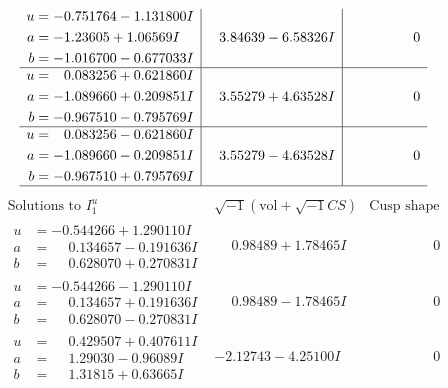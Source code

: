 \documentclass[1p]{elsarticle_modified}
\theoremstyle{definition}
\newcommand{\I}{\sqrt{-1}}
\begin{document}
$$\begin{array}{c|c|c}
\begin{aligned}
u &= -0.751764 - 1.131800 I \\
a &= -1.23605 + 1.06569 I \\
b &= -1.016700 - 0.677033 I\end{aligned}
 & \phantom{-}3.84639 - 6.58326 I & \phantom{-0.000000 } 0 \\ \hline\begin{aligned}
u &= \phantom{-}0.083256 + 0.621860 I \\
a &= -1.089660 + 0.209851 I \\
b &= -0.967510 - 0.795769 I\end{aligned}
 & \phantom{-}3.55279 + 4.63528 I & \phantom{-0.000000 } 0 \\ \hline\begin{aligned}
u &= \phantom{-}0.083256 - 0.621860 I \\
a &= -1.089660 - 0.209851 I \\
b &= -0.967510 + 0.795769 I\end{aligned}
 & \phantom{-}3.55279 - 4.63528 I & \phantom{-0.000000 } 0\\
 \hline 
 \end{array}$$\newpage$$\begin{array}{c|c|c}  
\text{Solutions to }I^u_{1}& \I (\text{vol} + \sqrt{-1}CS) & \text{Cusp shape}\\
 \hline 
\begin{aligned}
u &= -0.544266 + 1.290110 I \\
a &= \phantom{-}0.134657 - 0.191636 I \\
b &= \phantom{-}0.628070 + 0.270831 I\end{aligned}
 & \phantom{-}0.98489 + 1.78465 I & \phantom{-0.000000 } 0 \\ \hline\begin{aligned}
u &= -0.544266 - 1.290110 I \\
a &= \phantom{-}0.134657 + 0.191636 I \\
b &= \phantom{-}0.628070 - 0.270831 I\end{aligned}
 & \phantom{-}0.98489 - 1.78465 I & \phantom{-0.000000 } 0 \\ \hline\begin{aligned}
u &= \phantom{-}0.429507 + 0.407611 I \\
a &= \phantom{-}1.29030 - 0.96089 I \\
b &= \phantom{-}1.31815 + 0.63665 I\end{aligned}
 & -2.12743 - 4.25100 I & \phantom{-0.000000 } 0 \\ \hline\begin{aligned}

\end{aligned}
\end{array}$$
\end{document}
